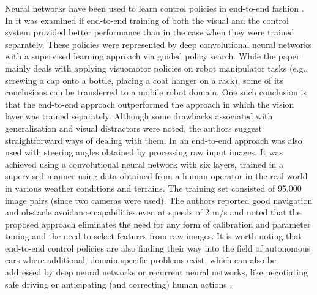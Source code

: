 Neural networks have been used to learn control policies in end-to-end fashion \cite{Levine2015, Muller2006}. In \cite{Levine2015} it was examined if end-to-end training of both the visual and the control system provided better performance than in the case when they were trained separately. These policies were represented by deep convolutional neural networks with a supervised learning approach via guided policy search. While the paper mainly deals with applying visuomotor policies on robot manipulator tasks (e.g., screwing a cap onto a bottle, placing a coat hanger on a rack), some of its conclusions can be transferred to a mobile robot domain. One such conclusion is that the end-to-end approach outperformed the approach in which the vision layer was trained separately. Although some drawbacks associated with generalisation and visual distractors were noted, the authors suggest straightforward ways of dealing with them. In \cite{Muller2006} an end-to-end approach was also used with steering angles obtained by processing raw input images. It was achieved using a convolutional neural network with six layers, trained in a supervised manner using data obtained from a human operator in the real world in various weather conditions and terrains. The training set consisted of 95,000 image pairs (since two cameras were used). The authors reported good navigation and obstacle avoidance capabilities even at speeds of 2 m/s and noted that the proposed approach eliminates the need for any form of calibration and parameter tuning and the need to select features from raw images. It is worth noting that end-to-end control policies are also finding their way into the field of autonomous cars \cite{Bojarski2016} where additional, domain-specific problems exist, which can also be addressed by deep neural networks or recurrent neural networks, like negotiating safe driving \cite{ShalevShwartz2016} or anticipating (and correcting) human actions \cite{Jain2016}.


